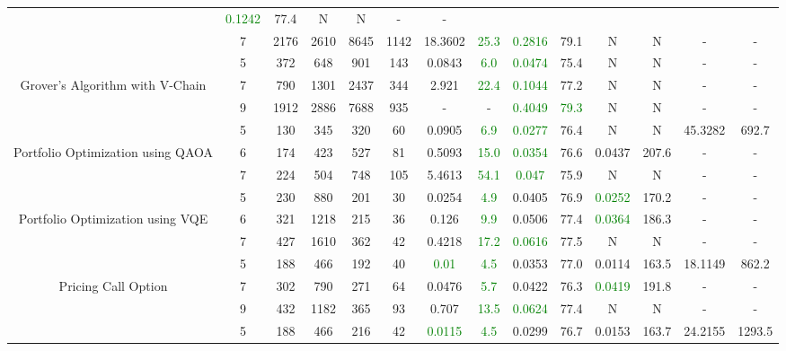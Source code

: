 \begin{table}[htb]
{\begin{tabular}{|c|c|c|c|c|c|c|c|c|c|c|c|c|c|}
 & \textcolor{green}{0.1242} & 77.4
 & N & N 
 & - & -
 \\
 & 
7 & 2176 & 2610 & 8645 & 1142
 & 18.3602 & \textcolor{green}{25.3}
 & \textcolor{green}{0.2816} & 79.1
 & N & N 
 & - & -
 \\
\hline
 & 
5 & 372 & 648 & 901 & 143
 & 0.0843 & \textcolor{green}{6.0}
 & \textcolor{green}{0.0474} & 75.4
 & N & N 
 & - & -
 \\
Grover's Algorithm with V-Chain & 
7 & 790 & 1301 & 2437 & 344
 & 2.921 & \textcolor{green}{22.4}
 & \textcolor{green}{0.1044} & 77.2
 & N & N 
 & - & -
 \\
 & 
9 & 1912 & 2886 & 7688 & 935
 & - & -
 & \textcolor{green}{0.4049} & \textcolor{green}{79.3}
 & N & N 
 & - & -
 \\
\hline
 & 
5 & 130 & 345 & 320 & 60
 & 0.0905 & \textcolor{green}{6.9}
 & \textcolor{green}{0.0277} & 76.4
 & N & N 
 & 45.3282 & 692.7
 \\
Portfolio Optimization using QAOA & 
6 & 174 & 423 & 527 & 81
 & 0.5093 & \textcolor{green}{15.0}
 & \textcolor{green}{0.0354} & 76.6
 & 0.0437 & 207.6
 & - & -
 \\
 & 
7 & 224 & 504 & 748 & 105
 & 5.4613 & \textcolor{green}{54.1}
 & \textcolor{green}{0.047} & 75.9
 & N & N 
 & - & -
 \\
\hline
 & 
5 & 230 & 880 & 201 & 30
 & 0.0254 & \textcolor{green}{4.9}
 & 0.0405 & 76.9
 & \textcolor{green}{0.0252} & 170.2
 & - & -
 \\
Portfolio Optimization using VQE & 
6 & 321 & 1218 & 215 & 36
 & 0.126 & \textcolor{green}{9.9}
 & 0.0506 & 77.4
 & \textcolor{green}{0.0364} & 186.3
 & - & -
 \\
 & 
7 & 427 & 1610 & 362 & 42
 & 0.4218 & \textcolor{green}{17.2}
 & \textcolor{green}{0.0616} & 77.5
 & N & N 
 & - & -
 \\
\hline
 & 
5 & 188 & 466 & 192 & 40
 & \textcolor{green}{0.01} & \textcolor{green}{4.5}
 & 0.0353 & 77.0
 & 0.0114 & 163.5
 & 18.1149 & 862.2
 \\
Pricing Call Option & 
7 & 302 & 790 & 271 & 64
 & 0.0476 & \textcolor{green}{5.7}
 & 0.0422 & 76.3
 & \textcolor{green}{0.0419} & 191.8
 & - & -
 \\
 & 
9 & 432 & 1182 & 365 & 93
 & 0.707 & \textcolor{green}{13.5}
 & \textcolor{green}{0.0624} & 77.4
 & N & N 
 & - & -
 \\
\hline
 & 
5 & 188 & 466 & 216 & 42
 & \textcolor{green}{0.0115} & \textcolor{green}{4.5}
 & 0.0299 & 76.7
 & 0.0153 & 163.7
 & 24.2155 & 1293.5
 \\

\end{tabular}}
\end{table}
